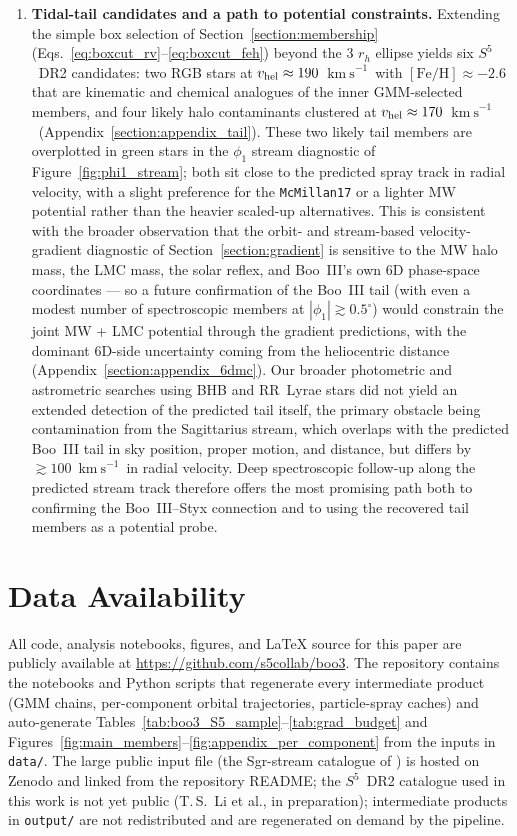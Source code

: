 \documentclass[twocolumn, apj, numberedappendix, appendixfloats]{openjournal_dhayaa}
\newcommand{\SSSSS}{${S}^5$\xspace}
\newcommand{\vlosUnits}{$\mathrm{km~s}^{-1}$\xspace}
\begin{document}
\begin{enumerate}[leftmargin=*]
\item \textbf{Tidal-tail candidates and a path to potential constraints.} Extending the simple box selection of Section~\ref{section:membership} (Eqs.~\ref{eq:boxcut_rv}--\ref{eq:boxcut_feh}) beyond the 3 $r_h$ ellipse yields six \SSSSS\ DR2 candidates: two RGB stars at $v_{\rm hel} \approx 190$~\vlosUnits\ with $[\mathrm{Fe/H}] \approx -2.6$ that are kinematic and chemical analogues of the inner GMM-selected members, and four likely halo contaminants clustered at $v_{\rm hel} \approx 170$~\vlosUnits\ (Appendix~\ref{section:appendix_tail}). These two likely tail members are overplotted in green stars in the $\phi_1$ stream diagnostic of Figure~\ref{fig:phi1_stream}; both sit close to the predicted spray track in radial velocity, with a slight preference for the \texttt{McMillan17} or a lighter MW potential rather than the heavier scaled-up alternatives. This is consistent with the broader observation that the orbit- and stream-based velocity-gradient diagnostic of Section~\ref{section:gradient} is sensitive to the MW halo mass, the LMC mass, the solar reflex, and Boo~III's own 6D phase-space coordinates --- so a future confirmation of the Boo~III tail (with even a modest number of spectroscopic members at $|\phi_1| \gtrsim 0.5^\circ$) would constrain the joint MW + LMC potential through the gradient predictions, with the dominant 6D-side uncertainty coming from the heliocentric distance (Appendix~\ref{section:appendix_6dmc}). Our broader photometric and astrometric searches using BHB and RR~Lyrae stars did not yield an extended detection of the predicted tail itself, the primary obstacle being contamination from the Sagittarius stream, which overlaps with the predicted Boo~III tail in sky position, proper motion, and distance, but differs by $\gtrsim 100$~\vlosUnits\ in radial velocity. Deep spectroscopic follow-up along the predicted stream track therefore offers the most promising path both to confirming the Boo~III--Styx connection and to using the recovered tail members as a potential probe.

\end{enumerate}

\section{Data Availability} \label{section:data_availability}
All code, analysis notebooks, figures, and LaTeX source for this paper are publicly available at \url{https://github.com/s5collab/boo3}.  The repository contains the notebooks and Python scripts that regenerate every intermediate product (GMM chains, per-component orbital trajectories, particle-spray caches) and auto-generate Tables~\ref{tab:boo3_S5_sample}--\ref{tab:grad_budget} and Figures~\ref{fig:main_members}--\ref{fig:appendix_per_component} from the inputs in \texttt{data/}.  The large public input file (the Sgr-stream catalogue of \citealt{Vasiliev2021}) is hosted on Zenodo and linked from the repository README; the \SSSSS\ DR2 catalogue used in this work is not yet public (T.\,S.~Li et al., in preparation); intermediate products in \texttt{output/} are not redistributed and are regenerated on demand by the pipeline.
\end{document}
